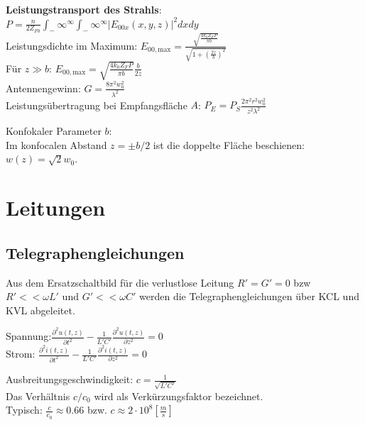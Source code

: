 \documentclass[english]{latex4ei/latex4ei_sheet}
\begin{document}
\begin{sectionbox}
	\textbf{Leistungstransport des Strahls}:\\
	$P = \frac{n}{2Z_{F0}}\int_-\infty^\infty\int_-\infty^\infty |E_{00x}(x,y,z)|^2 dxdy$\\
	Leistungsdichte im Maximum: $E_{00,\text{max}} = \frac{\sqrt{\frac{4k_0Z_FP}{\pi b}}}{\sqrt{1+\left(\frac{2z}{b}\right)^2}}$\\
	Für $z \gg b$: $E_{00,\text{max}} = \sqrt{\frac{4k_0Z_FP}{\pi b}}\frac{b}{2z}$\\
	Antennengewinn: $G = \frac{8\pi^2w_0^2}{\lambda^2}$\\
	Leistungsübertragung bei Empfangsfläche $A$: $P_E = P_S \frac{2\pi^2r^2w_0^2}{z^2\lambda^2}$

	Konfokaler Parameter $b$:\\
	Im konfocalen Abstand $z=\pm b/2$ ist die doppelte Fläche beschienen: $w(z) = \sqrt{2}w_0$.
\end{sectionbox}
\section{Leitungen}
\begin{sectionbox}
\subsection{Telegraphengleichungen}
Aus dem Ersatzschaltbild für die verlustlose Leitung $R'=G'=0$ bzw $R'<< \omega L'$ und $G' << \omega C'$ werden die Telegraphengleichungen über KCL und KVL abgeleitet.

\begin{emphbox}
Spannung:\qquad	$\frac{\partial^2 u(t,z)}{\partial t^2} - \frac{1}{L' C'} \frac{\partial^2 u(t,z)}{\partial z^2} = 0$\\
Strom:	\qquad $\frac{\partial^2 i(t,z)}{\partial t^2} - \frac{1}{L' C'} \frac{\partial^2 i(t,z)}{\partial z^2} = 0$\\
\end{emphbox}
Ausbreitungsgeschwindigkeit: $c=\frac{1}{\sqrt{L' C'}}$\\
Das Verhältnis $c/c_0$ wird als Verkürzungsfaktor bezeichnet.\\
Typisch: $\frac{c}{c_0} \approx 0.66$ bzw. $c\approx 2 \cdot 10^8 [\frac{m}{s}]$\\

\end{sectionbox}
\end{document}
